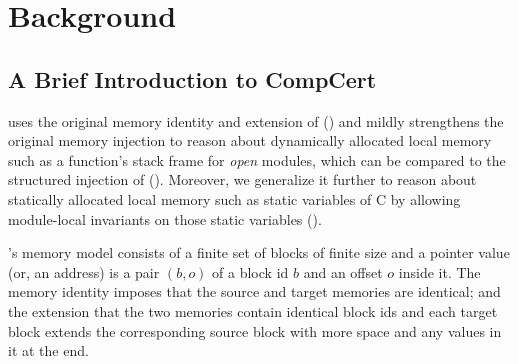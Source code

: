 \section{Background}
\label{sec:compiler:background}

\subsection{A Brief Introduction to CompCert}



\label{sec:overview-verification:injection}

\ccm{} uses the original memory identity and extension of \cc{}
() and mildly
strengthens the original memory injection to reason about dynamically allocated
local memory such as a function's stack frame for \emph{open} modules,
which can be compared to the structured injection of \ccc{}
().
Moreover, we generalize it further to reason about statically allocated local memory
such as static variables of C by allowing module-local invariants on those static variables
().


\label{sec:overview-verification:injection:original}
%
\cc{}'s memory model consists of a finite set of blocks of finite size
and a pointer value (or, an address) is a pair $(b,o)$ of a block id $b$ and an offset $o$ inside it.
The memory identity imposes that the source and target memories are identical;
and the extension that the two memories contain identical block ids and
each target block extends the corresponding source block
with more space and any values in it at the end.

